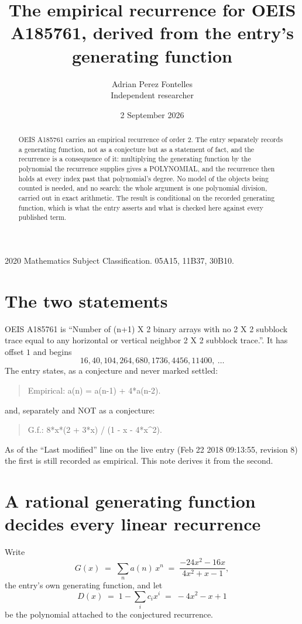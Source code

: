 \documentclass[11pt,a4paper]{article}
\title{The empirical recurrence for OEIS A185761, derived from the entry's generating function}
\author{Adrian Perez Fontelles\\ \small Independent researcher}
\date{2 September 2026}
\theoremstyle{plain}
\theoremstyle{definition}
\begin{document}
\maketitle

\begin{abstract}
OEIS A185761 carries an empirical recurrence of order $2$. The entry separately records a
generating function, not as a conjecture but as a statement of fact, and the recurrence is a
consequence of it: multiplying the generating function by the polynomial the recurrence
supplies gives a POLYNOMIAL, and the recurrence then holds at every index past that
polynomial's degree. No model of the objects being counted is needed, and no search: the
whole argument is one polynomial division, carried out in exact arithmetic. The result is
conditional on the recorded generating function, which is what the entry asserts and what is
checked here against every published term.
\end{abstract}

\noindent\small 2020 Mathematics Subject Classification. 05A15, 11B37, 30B10.\normalsize

\section{The two statements}

OEIS A185761 is ``Number of (n+1) X 2 binary arrays with no 2 X 2 subblock trace equal to any horizontal or vertical neighbor 2 X 2 subblock trace.''. It has offset $1$ and begins
\[
16, 40, 104, 264, 680, 1736, 4456, 11400,\ \dots
\]
The entry states, as a conjecture and never marked settled:
\begin{quote}
Empirical: a(n) = a(n-1) + 4*a(n-2).
\end{quote}
and, separately and NOT as a conjecture:
\begin{quote}
G.f.: 8*x*(2 + 3*x) / (1 - x - 4*x\^{}2).
\end{quote}
As of the ``Last modified'' line on the live entry (Feb 22 2018 09:13:55, revision 8) the first is still
recorded as empirical. This note derives it from the second.

\section{A rational generating function decides every linear recurrence}

Write
\[
G(x)\;=\;\sum_{n}a(n)\,x^{n}\;=\;\frac{- 24 x^{2} - 16 x}{4 x^{2} + x - 1},
\]
the entry's own generating function, and let
\[
D(x)\;=\;1-\sum_i c_i x^{i}\;=\;- 4 x^{2} - x + 1
\]
be the polynomial attached to the conjectured recurrence.
\end{document}
